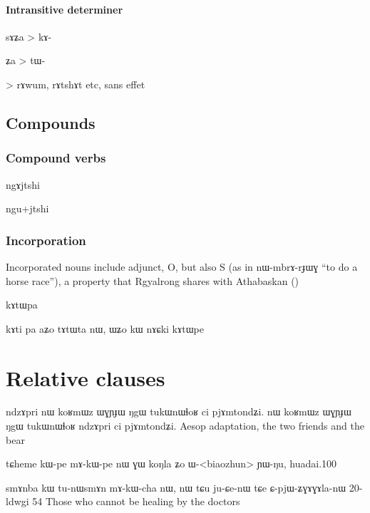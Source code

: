 \documentclass[oldfontcommands,oneside,a4paper,11pt]{memoir}
\newcommand{\ipa}[1]{{\phon #1}} %
\newcommand{\wav}[1]{}%
\begin{document}
\subsubsection{Intransitive determiner}  \label{subsub:intransitive.det}
sɤʑa > kɤ-

ʑa > tɯ-


> rɤwum, rɤtshɤt etc, sans effet
\section{Compounds} \label{sec:verbal.composition}

\subsection{Compound verbs}

ngɤjtshi

ngu+jtshi
\subsection{Incorporation} \label{sub:incorporation}
Incorporated nouns include adjunct, O, but also S (as in \ipa{nɯ-mbrɤ-rɟɯɣ} ``to do a horse race''), a property that Rgyalrong shares with Athabaskan (\citet[215]{rice2000scope})
 
kɤtɯpa

kɤti pa
 aʑo tɤtɯta nɯ, ɯʑo kɯ nɤɕki kɤtɯpe \wav{kAtWpa}
\chapter{Relative clauses} \label{chapt:relative}



%

ndzɤpri nɯ koʁmɯz ɯɣɲɟɯ ŋgɯ tukɯnɯɬoʁ ci pjɤmtondʑi. 
 nɯ koʁmɯz ɯɣɲɟɯ ŋgɯ tukɯnɯɬoʁ ndzɤpri ci pjɤmtondʑi. 
Aesop adaptation, the two friends and the bear

tɕheme	kɯ-pe	mɤ-kɯ-pe	nɯ	ɣɯ	koŋla	ʑo	ɯ-<biaozhun>	ɲɯ-ŋu,
huadai.100


smɤnba kɯ tu-nɯsmɤn mɤ-kɯ-cha nɯ, nɯ tɕu ju-ɕe-nɯ tɕe ɕ-pjɯ-ʑɣɤɣɤla-nɯ
20-ldwgi 54
Those who cannot be healing by the doctors
\end{document}
